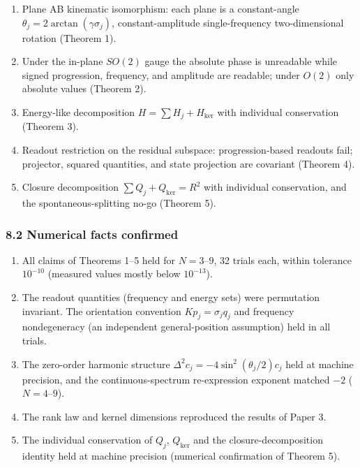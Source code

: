 \documentclass[
  a4paper,
]{article}
\providecommand{\tightlist}{%
  \setlength{\itemsep}{0pt}\setlength{\parskip}{0pt}}
\begin{document}
\begin{enumerate}
\def\labelenumi{\arabic{enumi}.}
\tightlist
\item
  Plane AB kinematic isomorphism: each plane is a constant-angle
  \(\theta_j=2\arctan(\gamma\sigma_j)\), constant-amplitude
  single-frequency two-dimensional rotation (Theorem 1).
\item
  Under the in-plane \(SO(2)\) gauge the absolute phase is unreadable
  while signed progression, frequency, and amplitude are readable; under
  \(O(2)\) only absolute values (Theorem 2).
\item
  Energy-like decomposition \(H=\sum H_j+H_{\ker}\) with individual
  conservation (Theorem 3).
\item
  Readout restriction on the residual subspace: progression-based
  readouts fail; projector, squared quantities, and state projection are
  covariant (Theorem 4).
\item
  Closure decomposition \(\sum Q_j+Q_{\ker}=R^2\) with individual
  conservation, and the spontaneous-splitting no-go (Theorem 5).
\end{enumerate}

\subsubsection{8.2 Numerical facts
confirmed}\label{numerical-facts-confirmed}

\begin{enumerate}
\def\labelenumi{\arabic{enumi}.}
\tightlist
\item
  All claims of Theorems 1--5 held for \(N=3\)--\(9\), 32 trials each,
  within tolerance \(10^{-10}\) (measured values mostly below
  \(10^{-13}\)).
\item
  The readout quantities (frequency and energy sets) were permutation
  invariant. The orientation convention \(Kp_j=\sigma_jq_j\) and
  frequency nondegeneracy (an independent general-position assumption)
  held in all trials.
\item
  The zero-order harmonic structure
  \(\Delta^2c_j=-4\sin^2(\theta_j/2)c_j\) held at machine precision, and
  the continuous-spectrum re-expression exponent matched \(-2\)
  (\(N=4\)--\(9\)).
\item
  The rank law and kernel dimensions reproduced the results of Paper 3.
\item
  The individual conservation of \(Q_j\), \(Q_{\ker}\) and the
  closure-decomposition identity held at machine precision (numerical
  confirmation of Theorem 5).
\end{enumerate}
\end{document}
